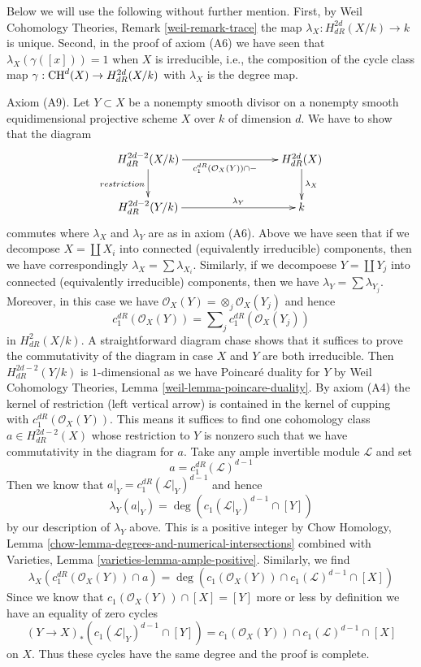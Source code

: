 \medskip\noindent
Below we will use the following without further mention.
First, by Weil Cohomology Theories, Remark \ref{weil-remark-trace}
the map $\lambda_X : H^{2d}_{dR}(X/k) \to k$ is unique.
Second, in the proof of axiom (A6) we have
seen that $\lambda_X(\gamma([x])) = 1$ when $X$ is irreducible, i.e.,
the composition of the cycle class map
$\gamma : \mathop{\mathrm{CH}}\nolimits^d(X) \to H_{dR}^{2d}(X/k)$ with $\lambda_X$
is the degree map.

\medskip\noindent
Axiom (A9). Let $Y \subset X$ be a nonempty smooth divisor on a
nonempty smooth equidimensional projective scheme $X$ over $k$
of dimension $d$. We have to show that the diagram
$$
\xymatrix{
H_{dR}^{2d - 2}(X/k)
\ar[rrr]_{c^{dR}_1(\mathcal{O}_X(Y)) \cap -} \ar[d]_{restriction} & & &
H_{dR}^{2d}(X) \ar[d]^{\lambda_X} \\
H_{dR}^{2d - 2}(Y/k) \ar[rrr]^-{\lambda_Y} & & & k
}
$$
commutes where $\lambda_X$ and $\lambda_Y$ are as in axiom (A6).
Above we have seen that if we decompose $X = \coprod X_i$ into connected
(equivalently irreducible) components, then
we have correspondingly $\lambda_X = \sum \lambda_{X_i}$.
Similarly, if we decompoese $Y = \coprod Y_j$ into connected (equivalently
irreducible) components, then we have $\lambda_Y = \sum \lambda_{Y_j}$.
Moreover, in this case we have
$\mathcal{O}_X(Y) = \otimes_j \mathcal{O}_X(Y_j)$ and hence
$$
c_1^{dR}(\mathcal{O}_X(Y)) = \sum\nolimits_j
c^{dR}_1(\mathcal{O}_X(Y_j))
$$
in $H_{dR}^2(X/k)$. A straightforward diagram chase shows that it suffices
to prove the commutativity of the diagram in case $X$ and $Y$ are both
irreducible. Then $H_{dR}^{2d - 2}(Y/k)$ is $1$-dimensional as
we have Poincar\'e duality for $Y$ by
Weil Cohomology Theories, Lemma \ref{weil-lemma-poincare-duality}.
By axiom (A4) the kernel of restriction (left vertical arrow)
is contained in the kernel of cupping with $c^{dR}_1(\mathcal{O}_X(Y))$.
This means it suffices to find one cohomology class
$a \in H_{dR}^{2d - 2}(X)$ whose restriction to $Y$ is nonzero
such that we have commutativity in the diagram for $a$.
Take any ample invertible module $\mathcal{L}$ and set
$$
a = c^{dR}_1(\mathcal{L})^{d - 1}
$$
Then we know that $a|_Y = c^{dR}_1(\mathcal{L}|_Y)^{d - 1}$
and hence
$$
\lambda_Y(a|_Y) = \deg(c_1(\mathcal{L}|_Y)^{d - 1} \cap [Y])
$$
by our description of $\lambda_Y$ above. This is a positive integer
by Chow Homology, Lemma
\ref{chow-lemma-degrees-and-numerical-intersections} combined with
Varieties, Lemma \ref{varieties-lemma-ample-positive}.
Similarly, we find
$$
\lambda_X(c^{dR}_1(\mathcal{O}_X(Y)) \cap a) =
\deg(c_1(\mathcal{O}_X(Y)) \cap c_1(\mathcal{L})^{d - 1} \cap [X])
$$
Since we know that $c_1(\mathcal{O}_X(Y)) \cap [X] = [Y]$ more or
less by definition we have an equality of zero cycles
$$
(Y \to X)_*\left(c_1(\mathcal{L}|_Y)^{d - 1} \cap [Y]\right) =
c_1(\mathcal{O}_X(Y)) \cap c_1(\mathcal{L})^{d - 1} \cap [X]
$$
on $X$. Thus these cycles have the same degree and the proof is complete.

